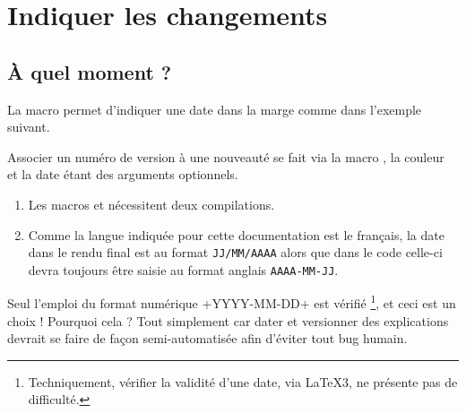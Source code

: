 \section{Indiquer les changements}

\subsection{À quel moment ?}


\begin{bdocexa}
    La macro  permet d'indiquer une date dans la marge comme dans l'exemple suivant.

\end{bdocexa}




\begin{bdocexa}
    Associer un numéro de version à une nouveauté se fait via la macro , la couleur et la date étant des arguments optionnels.

\end{bdocexa}


\begin{bdocimportant}
    \leavevmode

    \begin{enumerate}
        \item Les macros  et  nécessitent deux compilations.

        \item Comme la langue indiquée pour cette documentation est le français, la date dans le rendu final est au format \texttt{JJ/MM/AAAA} alors que dans le code celle-ci devra toujours être saisie au format anglais \texttt{AAAA-MM-JJ}.
    \end{enumerate}
\end{bdocimportant}


\begin{bdocwarn}
    Seul l'emploi du format numérique \bdocinlatex+YYYY-MM-DD+ est vérifié
    \footnote{
        Techniquement, vérifier la validité d'une date, via \LaTeX3, ne présente pas de difficulté.
    },
    et ceci est un choix ! Pourquoi cela ? Tout simplement car dater et versionner des explications devrait se faire de façon semi-automatisée afin d'éviter tout bug humain.
\end{bdocwarn}


